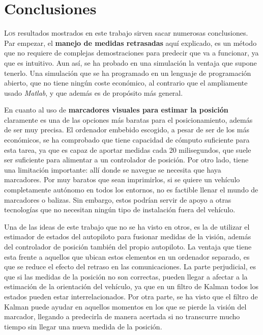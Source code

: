 \chapter{Conclusiones} \label{chp-conclusiones}



\lettrine[lraise=-0.1, lines=2, loversize=0.2]{L}{os} resultados mostrados en este trabajo sirven sacar numerosas conclusiones. Par empezar, el \textbf{manejo de medidas retrasadas} aquí explicado, es un método que no requiere de complejas demostraciones para predecir que va a funcionar, ya que es intuitivo. Aun así, se ha probado en una simulación la ventaja que supone tenerlo. Una simulación que se ha programado en un lenguaje de programación abierto, que no tiene ningún coste económico, al contrario que el ampliamente usado \textit{Matlab}, y que además es de propósito más general. 



En cuanto al uso de \textbf{marcadores visuales para estimar la posición} claramente es una de las opciones más baratas para el posicionamiento, además de ser muy precisa. El ordenador embebido escogido, a pesar de ser de los más económicos, se ha comprobado que tiene capacidad de cómputo suficiente para esta tarea, ya que es capaz de aportar medidas cada 20 milisegundos, que suele ser suficiente para alimentar a un controlador de posición.
Por otro lado, tiene una limitación importante: allí donde se navegue se necesita que haya marcadores. Por muy baratos que sean imprimirlos, si se quiere un vehículo completamente autónomo en todos los entornos, no es factible llenar el mundo de marcadores o balizas.  
Sin embargo, estos podrían servir de apoyo a otras tecnologías que no necesitan ningún tipo de instalación fuera del vehículo. 

Una de las ideas de este trabajo que no se ha visto en otros, es la de utilizar el estimador de estados del autopiloto para fusionar medidas de la visión, además del controlador de posición también del propio autopiloto. La ventaja que tiene esta frente a aquellos que ubican estos elementos en un ordenador separado, es que se reduce el efecto del retraso en las comunicaciones. 
La parte perjudicial, es que si las medidas de la posición no son correctas, pueden llegar a afectar a la estimación de la orientación del vehículo, ya que en un filtro de Kalman todos los estados pueden estar interrelacionados. Por otra parte, se ha visto que el filtro de Kalman puede ayudar en aquellos momentos en los que se pierde la visión del marcador, llegando a predecirla de manera acertada si no transcurre mucho tiempo sin llegar una nueva medida de la posición. 


